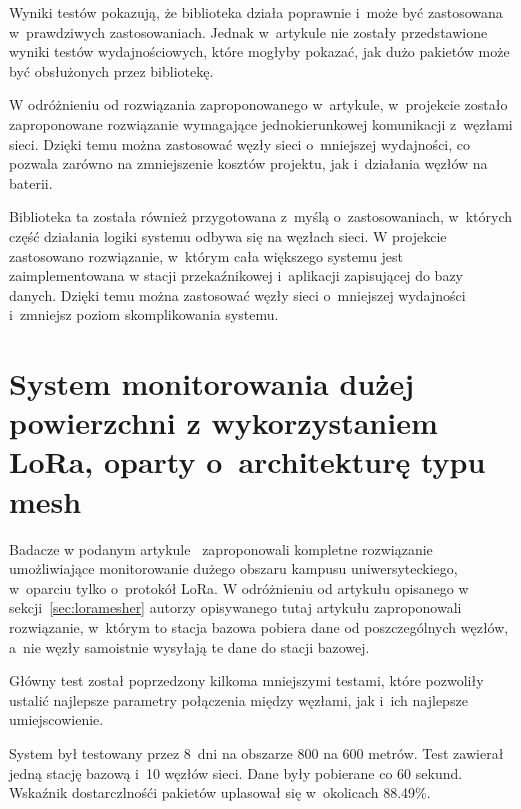 Wyniki testów pokazują, że biblioteka działa poprawnie i~może być zastosowana w~prawdziwych zastosowaniach.
Jednak w~artykule nie zostały przedstawione wyniki testów wydajnościowych, które mogłyby pokazać, jak dużo pakietów może być obsłużonych przez bibliotekę.

W odróżnieniu od rozwiązania zaproponowanego w~artykule, w~projekcie zostało zaproponowane rozwiązanie wymagające jednokierunkowej komunikacji z~węzłami sieci.
Dzięki temu można zastosować węzły sieci o~mniejszej wydajności, co pozwala zarówno na zmniejszenie kosztów projektu, jak i~działania węzłów na baterii.

Biblioteka ta została również przygotowana z~myślą o~zastosowaniach, w~których część działania logiki systemu odbywa się na węzłach sieci.
W projekcie zastosowano rozwiązanie, w~którym cała większego systemu jest zaimplementowana w stacji przekaźnikowej i~aplikacji zapisującej do bazy danych.
Dzięki temu można zastosować węzły sieci o~mniejszej wydajności i~zmniejsz poziom skomplikowania systemu.

\section{System monitorowania dużej powierzchni z wykorzystaniem LoRa, oparty o~architekturę typu mesh}

Badacze w podanym artykule~\cite{bib:loramesh-lee} zaproponowali kompletne rozwiązanie umożliwiające monitorowanie dużego obszaru kampusu uniwersyteckiego, w~oparciu tylko o~protokół LoRa.
W odróżnieniu od artykułu opisanego w sekcji~\ref{sec:loramesher} autorzy opisywanego tutaj artykułu zaproponowali rozwiązanie, w~którym to stacja bazowa pobiera dane od poszczególnych węzłów, a~nie węzły samoistnie wysyłają te dane do stacji bazowej.

Główny test został poprzedzony kilkoma mniejszymi testami, które pozwoliły ustalić najlepsze parametry połączenia między węzłami, jak i~ich najlepsze umiejscowienie.

System był testowany przez 8~dni na obszarze 800 na 600 metrów.
Test zawierał jedną stację bazową i~10 węzłów sieci.
Dane były pobierane co 60 sekund.
Wskaźnik dostarczlnośći pakietów uplasował się w~okolicach 88.49\%.

